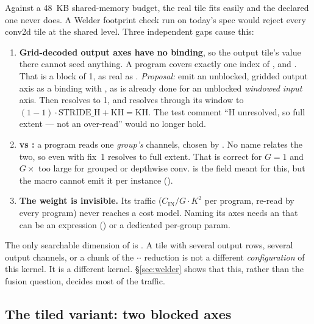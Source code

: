 Against a 48~KB shared-memory budget, the real tile fits easily and the declared one
never does. A Welder footprint check run on today's spec would reject every conv2d
tile at the shared level. Three independent gaps cause this:

\begin{enumerate}
\item \textbf{Grid-decoded output axes have no binding}, so the output tile's value
  there cannot seed anything. A program covers exactly one index of ,
   and . That is a block of 1, as real as .
  \emph{Proposal:} emit an unblocked, gridded output axis as a binding with
  , as is already done for an unblocked \emph{windowed input}
  axis. Then  resolves to 1, and  resolves through its window to
  $(1-1)\cdot\text{STRIDE\_H}+\text{KH} = \text{KH}$. The test comment ``H unresolved,
  so full extent --- not an over-read'' would no longer hold.
\item \textbf{ vs :} a program reads one \emph{group's}
   channels, chosen by . No name relates the two, so
  even with fix~1  resolves to full extent. That is correct for $G=1$ and
  $G\times$ too large for grouped or depthwise conv.  is the field
  meant for this, but the macro cannot emit it per instance ().
\item \textbf{The weight is invisible.} Its traffic ($C_{\text{IN}}/G \cdot K^2$ per
  program, re-read by every program) never reaches a cost model. Naming its axes
  needs an  that can be an expression () or a dedicated
  per-group param.
\end{enumerate}

\begin{note}
The only searchable dimension of  is . A tile
with several output rows, several output channels, or a chunk of the
$\cdot$$\cdot$ reduction is not a different
\emph{configuration} of this kernel. It is a different kernel. \S\ref{sec:welder}
shows that this, rather than the fusion question, decides most of the traffic.
\end{note}

\subsection{The tiled variant: two blocked axes}

